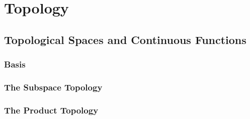 
\chapter{Topology}

\section{Topological Spaces and Continuous Functions}







\subsection{Basis}





















\subsection{The Subspace Topology}



\subsection{The Product Topology}


